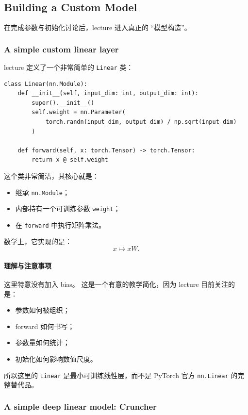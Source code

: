 \documentclass[a4paper,UTF8]{article}
\numberwithin{equation}{section}
\begin{document}
\subsection{Building a Custom Model}

在完成参数与初始化讨论后，lecture 进入真正的 ``模型构造''。

\subsubsection{A simple custom linear layer}

lecture 定义了一个非常简单的 \verb|Linear| 类：
\begin{verbatim}
class Linear(nn.Module):
    def __init__(self, input_dim: int, output_dim: int):
        super().__init__()
        self.weight = nn.Parameter(
            torch.randn(input_dim, output_dim) / np.sqrt(input_dim)
        )

    def forward(self, x: torch.Tensor) -> torch.Tensor:
        return x @ self.weight
\end{verbatim}

这个类非常简洁，其核心就是：
\begin{itemize}
    \item 继承 \verb|nn.Module|；
    \item 内部持有一个可训练参数 \verb|weight|；
    \item 在 \verb|forward| 中执行矩阵乘法。
\end{itemize}

数学上，它实现的是：
\[
x \mapsto xW.
\]

\paragraph{理解与注意事项}
这里特意没有加入 bias。  
这是一个有意的教学简化，因为 lecture 目前关注的是：
\begin{itemize}
    \item 参数如何被组织；
    \item forward 如何书写；
    \item 参数量如何统计；
    \item 初始化如何影响数值尺度。
\end{itemize}

所以这里的 \verb|Linear| 是最小可训练线性层，而不是 PyTorch 官方 \verb|nn.Linear| 的完整替代品。

\subsubsection{A simple deep linear model: Cruncher}
\end{document}
